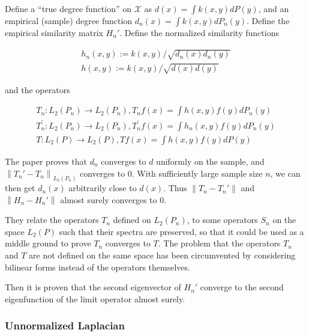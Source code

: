 {	Define a ``true degree function'' on $\mathcal{X}$ as $d(x)=\int k(x, y) d P(y)$, and an empirical (sample) degree function $d_n(x)=\int k(x, y) d P_{n}(y)$. Define the empirical similarity matrix $H_n'$. Define the normalized similarity functions
	
	\begin{equation}
		\begin{split}
			h_{n}(x, y):=k(x, y) / \sqrt{d_{n}(x) d_{n}(y)} \\
			h(x, y):=k(x, y) / \sqrt{d(x) d(y)}
		\end{split}
	\end{equation}
	
	and the operators
	
	\begin{equation}
		\begin{split}
			T_{n}: L_{2}\left(P_{n}\right) \rightarrow L_{2}\left(P_{n}\right), T_{n} f(x)=\int h(x, y) f(y) d P_{n}(y) \\
			T_{n}^{\prime}: L_{2}\left(P_{n}\right) \rightarrow L_{2}\left(P_{n}\right), T_{n}^{\prime} f(x)=\int h_{n}(x, y) f(y) d P_{n}(y) \\
			T: L_{2}(P) \rightarrow L_{2}(P), T f(x)=\int h(x, y) f(y) d P(y)
		\end{split}
	\end{equation}
	
	The paper proves that $d_n$ converges to $d$ uniformly on the sample, and $\left\|T_n'-T_n\right\|_{L_{2}\left(P_{n}\right)}$ converges to 0. With sufficiently large sample size $n$, we can then get $d_n(x)$ arbitrarily close to $d(x)$. Thus $\left\|T_{n}-T_{n}'\right\|$ and $\left\|H_{n}-H_{n}'\right\|$ almost surely converges to 0.
	
	They relate the operators $T_n$ defined on $L_2 (P_n)$, to some operators $S_n$ on the space $L_2 (P)$ such that their spectra are preserved, so that it could be used as a middle ground to prove $T_n$ converges to $T$. The problem that the operators $T_n$ and $T$ are not defined on the same space has been circumvented by considering bilinear forms instead of the operators themselves.
	
	Then it is proven that the second eigenvector of $H_n'$ converge to the second eigenfunction of the limit operator almost surely.
	
	\subsubsection{Unnormalized Laplacian}
	
}
